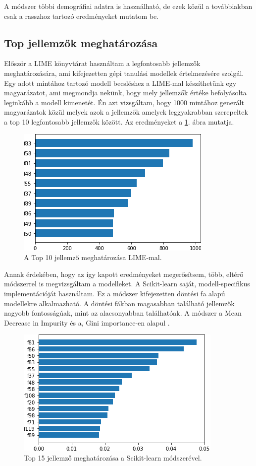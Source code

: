 A módszer többi demográfiai adatra is használható, de ezek közül a továbbiakban csak a rasszhoz tartozó eredményeket mutatom be. 

\subsection{Top jellemzők meghatározása}

Először a LIME \cite{lime2016} könyvtárat használtam a legfontosabb jellemzők meghatározására, ami kifejezetten gépi tanulási modellek értelmezésére szolgál. Egy adott mintához tartozó modell becsléshez a LIME-mal készíthetünk egy magyarázatot, ami megmondja nekünk, hogy mely jellemzők értéke befolyásolta leginkább a modell kimenetét. Én azt vizsgáltam, hogy 1000 mintához generált magyarázatok közül melyek azok a jellemzők amelyek leggyakrabban szerepeltek a top 10 legfontosabb jellemzők között. Az eredményeket a \ref{fig:lime}. ábra mutatja.

\begin{figure}[ht]
	\centering
	\includegraphics[width=0.6\columnwidth]{figures/imp_lime.png}
	\caption{A Top 10 jellemző meghatározása LIME-mal.}
	\label{fig:lime}
\end{figure}

Annak érdekében, hogy az így kapott eredményeket megerősítsem, több, eltérő módszerrel is megvizsgáltam a modelleket. A Scikit-learn saját, modell-specifikus implementációját használtam. Ez a módszer kifejezetten döntési fa alapú modellekre alkalmazható. A döntési fákban magasabban található jellemzők nagyobb fontosságúak, mint az alacsonyabban találhatóak. A módszer a Mean Decrease in Impurity és a, Gini importance-en alapul \cite{breiman2017classification}.

\begin{figure}[ht]
	\centering
	\includegraphics[width=0.7\columnwidth]{figures/imp_gini.png}
	\caption{Top 15 jellemző meghatározása a Scikit-learn módszerével.}
\end{figure}


